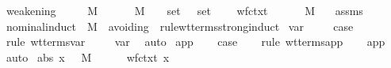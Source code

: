 \begin{isabellebody}
\endisatagproof
{\isafoldproof}%
%
\isadelimproof
\isanewline
%
\endisadelimproof
\isanewline
{}\isamarkupfalse%
\ weakening{\isacharcolon}\isanewline
\ \ \ {\isasymGamma}\ {\isasymGamma}{\isacharprime}\ M\ {\isasymsigma}\isanewline
\ \ \ {\isachardoublequoteopen}{\isasymGamma}\ {\isasymturnstile}\ M\ {\isacharcolon}\ {\isasymsigma}{\isachardoublequoteclose}\ \ {\isachardoublequoteopen}set\ {\isasymGamma}\ {\isasymsubseteq}\ set\ {\isasymGamma}{\isacharprime}{\isachardoublequoteclose}\isanewline
\ \ \ {\isachardoublequoteopen}wf{\isacharunderscore}ctxt\ {\isasymGamma}{\isacharprime}{\isachardoublequoteclose}\isanewline
\ \ \ {\isachardoublequoteopen}{\isasymGamma}{\isacharprime}\ {\isasymturnstile}\ M\ {\isacharcolon}\ {\isasymsigma}{\isachardoublequoteclose}\isanewline
%
\isadelimproof
%
\endisadelimproof
%
\isatagproof
{}\isamarkupfalse%
\ assms\ \isamarkupfalse%
\ {\isacharparenleft}nominal{\isacharunderscore}induct\ {\isasymGamma}\ M\ {\isasymsigma}\ avoiding{\isacharcolon}\ {\isasymGamma}{\isacharprime}\ rule{\isacharcolon}wt{\isacharunderscore}terms{\isachardot}strong{\isacharunderscore}induct{\isacharparenright}\isanewline
{}\isamarkupfalse%
\ var\ \isanewline
\ \ \isamarkupfalse%
\ {\isacharquery}case\ \isanewline
\ \ \isamarkupfalse%
\ {\isacharparenleft}rule\ wt{\isacharunderscore}terms{\isachardot}var{\isacharparenright}\ \isanewline
\ \ \isamarkupfalse%
\ var\ \isamarkupfalse%
\ auto\isanewline
{}\isamarkupfalse%
\isanewline
{}\isamarkupfalse%
\ app\isanewline
\ \ \isamarkupfalse%
\ {\isacharquery}case\isanewline
\ \ \isamarkupfalse%
\ {\isacharparenleft}rule\ wt{\isacharunderscore}terms{\isachardot}app{\isacharparenright}\isanewline
\ \ \isamarkupfalse%
\ app\ \isamarkupfalse%
\ auto\isanewline
{}\isamarkupfalse%
\isanewline
{}\isamarkupfalse%
\ {\isacharparenleft}abs\ x\ {\isasymGamma}\ {\isasymsigma}\ M\ {\isasymtau}{\isacharparenright}\isanewline
\ \ \isamarkupfalse%
\ {}{\isacharcolon}\ {\isachardoublequoteopen}wf{\isacharunderscore}ctxt\ {\isacharparenleft}{\isacharparenleft}x{\isacharcomma}\ {\isasymsigma}{\isacharparenright}\ {\isacharhash}\ {\isasymGamma}{\isacharprime}{\isacharparenright}{\isachardoublequoteclose}\ \isanewline
\ \ \isamarkupfalse%

\end{isabellebody}
